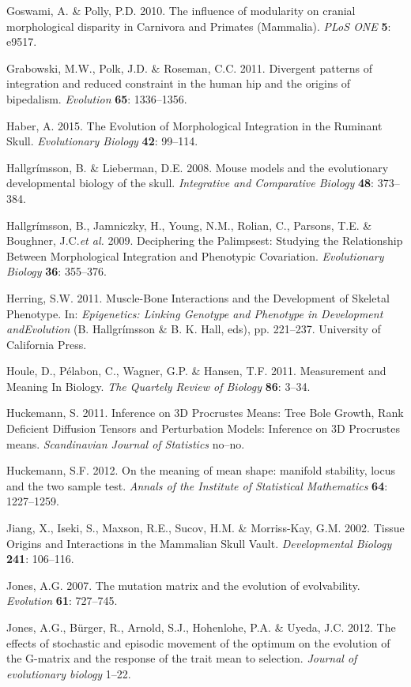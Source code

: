 \documentclass[12pt,]{article}
\begin{document}
Goswami, A. \& Polly, P.D. 2010. The influence of modularity on cranial
morphological disparity in Carnivora and Primates (Mammalia). \emph{PLoS
ONE} \textbf{5}: e9517.

Grabowski, M.W., Polk, J.D. \& Roseman, C.C. 2011. Divergent patterns of
integration and reduced constraint in the human hip and the origins of
bipedalism. \emph{Evolution} \textbf{65}: 1336--1356.

Haber, A. 2015. The Evolution of Morphological Integration in the
Ruminant Skull. \emph{Evolutionary Biology} \textbf{42}: 99--114.

Hallgrímsson, B. \& Lieberman, D.E. 2008. Mouse models and the
evolutionary developmental biology of the skull. \emph{Integrative and
Comparative Biology} \textbf{48}: 373--384.

Hallgrímsson, B., Jamniczky, H., Young, N.M., Rolian, C., Parsons, T.E.
\& Boughner, J.C.\emph{et al.} 2009. Deciphering the Palimpsest:
Studying the Relationship Between Morphological Integration and
Phenotypic Covariation. \emph{Evolutionary Biology} \textbf{36}:
355--376.

Herring, S.W. 2011. Muscle-Bone Interactions and the Development of
Skeletal Phenotype. In: \emph{Epigenetics: Linking Genotype and
Phenotype in Development andEvolution} (B. Hallgrímsson \& B. K. Hall,
eds), pp. 221--237. University of California Press.

Houle, D., Pélabon, C., Wagner, G.P. \& Hansen, T.F. 2011. Measurement
and Meaning In Biology. \emph{The Quartely Review of Biology}
\textbf{86}: 3--34.

Huckemann, S. 2011. Inference on 3D Procrustes Means: Tree Bole Growth,
Rank Deficient Diffusion Tensors and Perturbation Models: Inference on
3D Procrustes means. \emph{Scandinavian Journal of Statistics} no--no.

Huckemann, S.F. 2012. On the meaning of mean shape: manifold stability,
locus and the two sample test. \emph{Annals of the Institute of
Statistical Mathematics} \textbf{64}: 1227--1259.

Jiang, X., Iseki, S., Maxson, R.E., Sucov, H.M. \& Morriss-Kay, G.M.
2002. Tissue Origins and Interactions in the Mammalian Skull Vault.
\emph{Developmental Biology} \textbf{241}: 106--116.

Jones, A.G. 2007. The mutation matrix and the evolution of evolvability.
\emph{Evolution} \textbf{61}: 727--745.

Jones, A.G., Bürger, R., Arnold, S.J., Hohenlohe, P.A. \& Uyeda, J.C.
2012. The effects of stochastic and episodic movement of the optimum on
the evolution of the G-matrix and the response of the trait mean to
selection. \emph{Journal of evolutionary biology} 1--22.
\end{document}

